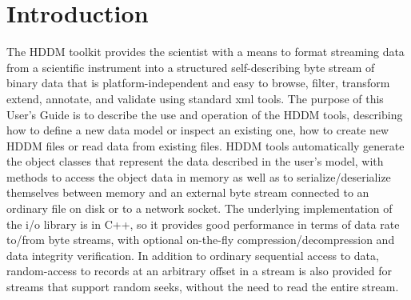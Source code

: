 \documentclass{revtex4}
\begin{document}
%
%
%
%

\newpage
\tableofcontents
\newpage
\section{Introduction}

The HDDM toolkit provides the scientist with a means to format streaming data
from a scientific instrument into a structured self-describing byte stream of
binary data that is platform-independent and easy to browse, filter, transform
extend, annotate, and validate using standard xml tools. The purpose of this 
User's Guide is to describe the use and operation of the HDDM tools, describing
how to define a new data model or inspect an existing one, how to create new
HDDM files or read data from existing files. HDDM tools automatically generate
the object classes that represent the data described in the user's model, with
methods to access the object data in memory as well as to serialize/deserialize
themselves between memory and an external byte stream connected to an ordinary
file on disk or to a network socket. The underlying implementation of the i/o
library is in C++, so it provides good performance in terms of data rate to/from
byte streams, with optional on-{}the-{}fly compression/decompression and data 
integrity verification. In addition to ordinary sequential access to data,
random-{}access to records at an arbitrary offset in a stream is also provided
for streams that support random seeks, without the need to read the entire stream.
\end{document}
